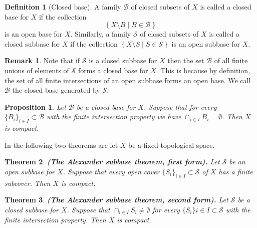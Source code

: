 \documentclass[11pt,a4paper]{article}
\theoremstyle{definition}
\newtheorem{definition}{Definition}[section]
\newtheorem{remark}{Remark}[section]
\theoremstyle{plain}
\newtheorem{theorem}{Theorem}[section]
\newtheorem{proposition}[theorem]{Proposition}
\newcommand{\set}[2]{ \left\{ #1 \mid #2 \right\} }
\renewcommand{\tt}[1]{\textnormal{\textbf{(#1).}}} %
\begin{document}
  \begin{definition}[Closed base]
    A family $\mathcal{B}$ of closed subsets of $X$ is called a 
    closed base for $X$ if the collection
    \[
      \set{X \setminus B}{B \in \mathcal B}
    \]
    is an open base for $X$. Similarly, a family $\mathcal S$ of
    closed subsets of $X$ is called a closed subbase for $X$ 
    if the collection $\set{X \setminus S}{S \in \mathcal S}$ is 
    an open subbase for $X$.
  \end{definition}

  \begin{remark}
    Note that if $\mathcal S$ is a closed subbase for $X$ then the set 
    $\mathcal{B}$ of all finite unions of elements of $\mathcal S$ forms 
    a closed base for $X$. This is because by definition,
    the set of all finite intersections of an open subbase forms an open 
    base. We call $\mathcal B$ the closed base generated by 
    $\mathcal S$.
  \end{remark}

  \begin{proposition}\label{prp:alexander}
    Let $\mathcal{B}$ be a closed base for $X$. Suppose that for every 
    $\{B_i\}_{i \in I} \subset \mathcal{B}$ with the finite intersection 
    property we have $\cap_{i \in I}{B_i} = \emptyset$. Then $X$ is 
    compact.
  \end{proposition}

  In the following two theorems are let $X$ be a fixed topological space.

  \begin{theorem}\label{thm:alexander-first}
    \tt{The Alexander subbase theorem, first form}
    Let $\mathcal{S}$ be an open subbase for $X$. Suppose that every 
    open cover $\{S_i\}_{i \in I} \subset \mathcal{S}$ of $X$ has a 
    finite subcover. Then $X$ is compact.
  \end{theorem}

  \begin{theorem}\label{thm:alexander-second}
    \tt{The Alexander subbase theorem, second form}
    Let $\mathcal{S}$ be a closed subbase for $X$. Suppose that 
    $\cap_{i \in I}{S_i} \neq \emptyset$ for every 
    $\{S_i\}{i \in I} \subset \mathcal{S}$ with the finite intersection 
    property. Then $X$ is compact.
  \end{theorem}
\end{document}
